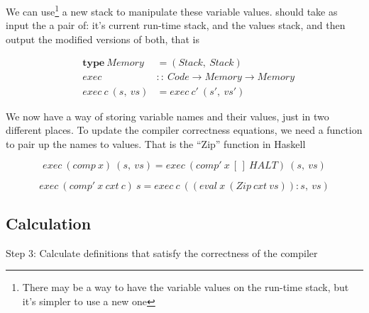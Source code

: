 \documentclass {article}
\begin{document}
We can use\footnote{
There may be a way to have the variable values
on the run-time stack, but it's
simpler to use a new one}
a new stack to
manipulate these variable values.
\exec should take as input
the a pair of:
it's current run-time stack,
and the values stack,
and then output the modified versions of both,
that is

\begin{eqnarray*}
	&\textbf{type}\ Memory\ &= (Stack,\ Stack) \\
	&exec &::\ Code \rightarrow Memory \rightarrow Memory \\
	&exec\ c\ (s,\ vs) &= exec\ c'\ (s',\ vs')
\end{eqnarray*}

We now have a way of storing variable names
and their values, 
just in two different places.
To update the compiler correctness equations,
we need a function to pair up the names
to values.
That is the ``Zip'' function in Haskell

\begin{spec}
	\[ exec\ (comp\ x)\ (s,\ vs) 
		= exec\ (comp'\ x\ [\,]\ HALT)\ (s,\ vs) \]
\end{spec}
\begin{spec}
	\[ exec\ (comp'\ x\ cxt\ c)\ s 
		= exec\ c\ ((eval\ x\ (Zip\ cxt\ vs)):s,\ vs) \]
\end{spec}

\subsection{Calculation}

Step 3: Calculate definitions that satisfy
	the correctness of the compiler




\end{document}
